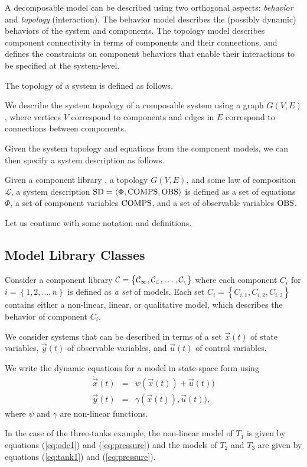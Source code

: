 \par
A decomposable model can be described using two orthogonal aspects:
\textit{behavior} and \textit{topology} (interaction). The behavior
model describes the (possibly dynamic) behaviors of the system and
components. The topology model describes component connectivity in
terms of components and their connections, and defines the constraints
on component behaviors that enable their interactions to be specified
at the system-level.
\par
The topology of a system is defined as follows.
%
\begin{definition}[Topology]
%
We describe the system topology of a composable system using a graph
$G(V, E)$, where vertices $V$ correspond to components and edges in
$E$ correspond to connections between components.
%
\end{definition}
%
Given the system topology and equations from the component models, we can then specify a system description as follows.
\begin{definition}
%
Given a component library \cl, a topology $G(V, E)$, and some law of
composition $\mathcal{L}$, a system description $\mathrm{SD} = \langle\Phi,
\mathrm{COMPS}, \mathrm{OBS}\rangle$ is defined as a set of
equations $\Phi$, a set of component variables $\mathrm{COMPS}$, and a set of
observable variables $\mathrm{OBS}$.
%
\end{definition}
%
Let us continue with some notation and definitions.
%
\subsection{ Model Library Classes}
%
Consider a component library $\cal{C} = \left\{C_1, C_2, \ldots,
C_n\right\}$ where each component $C_i$ for $i = \left\{1, 2, \ldots,
n\right\}$ is defined as \textit{a set} of models. Each set $C_i =
\left\{C_{i, 1}, C_{i, 2}, C_{i, 3}\right\}$ contains either a non-linear,
linear, or qualitative model, which describes the behavior of component $C_i$.

We consider systems that can be described in terms of a set
${\vec{x}}(t)$ of state variables, $\vec{y}(t)$ of observable variables,
and $\vec{u}(t)$ of control variables.

\begin{definition}
We write the dynamic equations for a model in state-space form using
\begin{eqnarray}\label{eq:nonlinear}
\dot{\vec{x}}(t) & = & \psi (\vec{x}(t)) + \vec{u}(t))\\
\vec{y}(t) & = & \gamma (\vec{x}(t)), \vec{u}(t)),
\end{eqnarray}
where  $\psi$ and $\gamma$ are non-linear functions.
\end{definition}
%
In the case of the three-tanks example, the non-linear model of $T_1$
is given by equations (\ref{eq:ode1}) and (\ref{eq:pressure}) and the
models of $T_2$ and $T_3$ are given by equations (\ref{eq:tank1}) and
(\ref{eq:pressure}).

